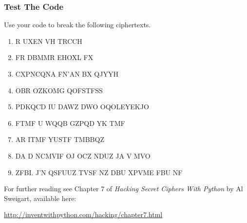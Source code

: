 \documentclass{beamer}
\newcommand{\<}{\langle}
\renewcommand{\>}{\rangle}
\begin{document}
\begin{frame}
\frametitle{Test The Code}

Use your code to break the following ciphertexts.
\begin{enumerate}
\item R UXEN VH TRCCH
\item FR DBMMR EHOXL FX
\item CXPNCQNA FN'AN BX QJYYH
\item OBR OZKOMG QOFSTFSS
\item PDKQCD IU DAWZ DWO OQOLEYEKJO
\item FTMF U WQQB GZPQD YK TMF
\item AR ITMF YUSTF TMBBQZ
\item DA D NCMVIF OJ OCZ NDUZ JA V MVO
\item ZFBI. J'N QSFUUZ TVSF NZ DBU XPVME FBU NF
\end{enumerate}
\end{frame}


\begin{frame}
For further reading see Chapter 7 of \emph{Hacking Secret Ciphers With Python} by Al Sweigart, available here: \newline

\url{http://inventwithpython.com/hacking/chapter7.html}
\end{frame}
\end{document}
